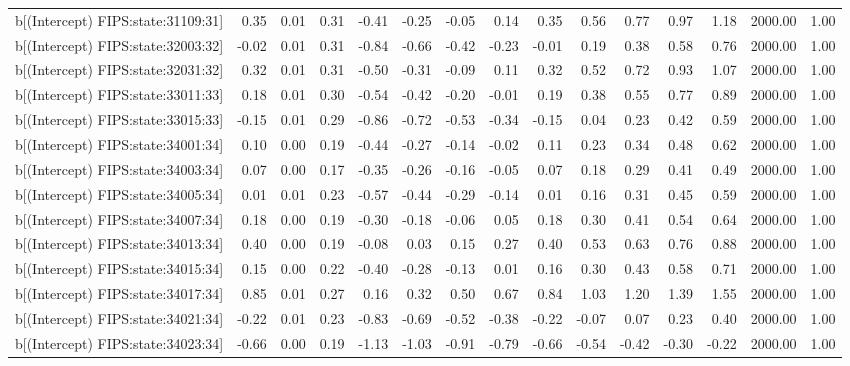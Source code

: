 \begin{table}[ht]
\begin{tabular}{rrrrrrrrrrrrrrr}
  b[(Intercept) FIPS:state:31109:31] & 0.35 & 0.01 & 0.31 & -0.41 & -0.25 & -0.05 & 0.14 & 0.35 & 0.56 & 0.77 & 0.97 & 1.18 & 2000.00 & 1.00 \\ 
  b[(Intercept) FIPS:state:32003:32] & -0.02 & 0.01 & 0.31 & -0.84 & -0.66 & -0.42 & -0.23 & -0.01 & 0.19 & 0.38 & 0.58 & 0.76 & 2000.00 & 1.00 \\ 
  b[(Intercept) FIPS:state:32031:32] & 0.32 & 0.01 & 0.31 & -0.50 & -0.31 & -0.09 & 0.11 & 0.32 & 0.52 & 0.72 & 0.93 & 1.07 & 2000.00 & 1.00 \\ 
  b[(Intercept) FIPS:state:33011:33] & 0.18 & 0.01 & 0.30 & -0.54 & -0.42 & -0.20 & -0.01 & 0.19 & 0.38 & 0.55 & 0.77 & 0.89 & 2000.00 & 1.00 \\ 
  b[(Intercept) FIPS:state:33015:33] & -0.15 & 0.01 & 0.29 & -0.86 & -0.72 & -0.53 & -0.34 & -0.15 & 0.04 & 0.23 & 0.42 & 0.59 & 2000.00 & 1.00 \\ 
  b[(Intercept) FIPS:state:34001:34] & 0.10 & 0.00 & 0.19 & -0.44 & -0.27 & -0.14 & -0.02 & 0.11 & 0.23 & 0.34 & 0.48 & 0.62 & 2000.00 & 1.00 \\ 
  b[(Intercept) FIPS:state:34003:34] & 0.07 & 0.00 & 0.17 & -0.35 & -0.26 & -0.16 & -0.05 & 0.07 & 0.18 & 0.29 & 0.41 & 0.49 & 2000.00 & 1.00 \\ 
  b[(Intercept) FIPS:state:34005:34] & 0.01 & 0.01 & 0.23 & -0.57 & -0.44 & -0.29 & -0.14 & 0.01 & 0.16 & 0.31 & 0.45 & 0.59 & 2000.00 & 1.00 \\ 
  b[(Intercept) FIPS:state:34007:34] & 0.18 & 0.00 & 0.19 & -0.30 & -0.18 & -0.06 & 0.05 & 0.18 & 0.30 & 0.41 & 0.54 & 0.64 & 2000.00 & 1.00 \\ 
  b[(Intercept) FIPS:state:34013:34] & 0.40 & 0.00 & 0.19 & -0.08 & 0.03 & 0.15 & 0.27 & 0.40 & 0.53 & 0.63 & 0.76 & 0.88 & 2000.00 & 1.00 \\ 
  b[(Intercept) FIPS:state:34015:34] & 0.15 & 0.00 & 0.22 & -0.40 & -0.28 & -0.13 & 0.01 & 0.16 & 0.30 & 0.43 & 0.58 & 0.71 & 2000.00 & 1.00 \\ 
  b[(Intercept) FIPS:state:34017:34] & 0.85 & 0.01 & 0.27 & 0.16 & 0.32 & 0.50 & 0.67 & 0.84 & 1.03 & 1.20 & 1.39 & 1.55 & 2000.00 & 1.00 \\ 
  b[(Intercept) FIPS:state:34021:34] & -0.22 & 0.01 & 0.23 & -0.83 & -0.69 & -0.52 & -0.38 & -0.22 & -0.07 & 0.07 & 0.23 & 0.40 & 2000.00 & 1.00 \\ 
  b[(Intercept) FIPS:state:34023:34] & -0.66 & 0.00 & 0.19 & -1.13 & -1.03 & -0.91 & -0.79 & -0.66 & -0.54 & -0.42 & -0.30 & -0.22 & 2000.00 & 1.00 \\ 

\end{tabular}
\end{table}
